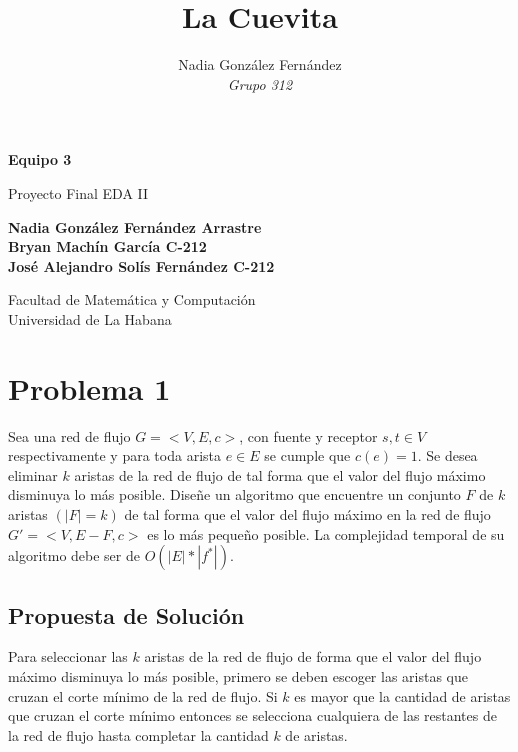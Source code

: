 \documentclass[a4paper,10pt]{article}
\title{\textbf{La Cuevita}}
\author{Nadia González Fernández 
	\\\emph{Grupo 312}}
\date{}
\begin{document}
	\begin{titlepage}
		\begin{center}
			\vspace*{1cm}
			\textbf{Equipo 3}
			
			\vspace{0.5cm}
			Proyecto Final EDA II
			
			\vspace{1.5cm}
			\textbf{Nadia González Fernández \textnormal{Arrastre}
				\\Bryan Machín Garc\'ia \textnormal{C-212}
				\\José Alejandro Sol\'is Fern\'andez \textnormal{C-212}}
			
			\vspace{5cm}
			Facultad de Matemática y Computación\\
			Universidad de La Habana
			
		\end{center}
	\end{titlepage}

	\section{Problema 1}
 	 Sea una red de flujo $G = <V,E,c>$, con fuente y receptor $s,t \in V$ respectivamente y para toda arista $e \in E$ se cumple que $c(e) = 1$. Se desea eliminar $k$ aristas de la red de flujo de tal forma que el valor del flujo m\'aximo disminuya lo m\'as posible. Dise\~ne un algoritmo que encuentre un conjunto $F$ de $k$ aristas $(|F| = k)$ de tal forma que el valor del flujo m\'aximo en la red de flujo $G' = <V,E - F,c>$ es lo m\'as peque\~no posible. La complejidad temporal de su algoritmo debe ser de $O(|E|*|f^*|)$. 	
	\subsection{Propuesta de Soluci\'on}
	 Para seleccionar las $k$ aristas de la red de flujo de forma que el valor del flujo m\'aximo disminuya lo m\'as posible, primero se deben escoger las aristas que cruzan el corte m\'inimo de la red de flujo. Si $k$ es mayor que la cantidad de aristas que cruzan el corte m\'inimo entonces se selecciona cualquiera de las restantes de la red de flujo hasta completar la cantidad $k$ de aristas.
\end{document}
